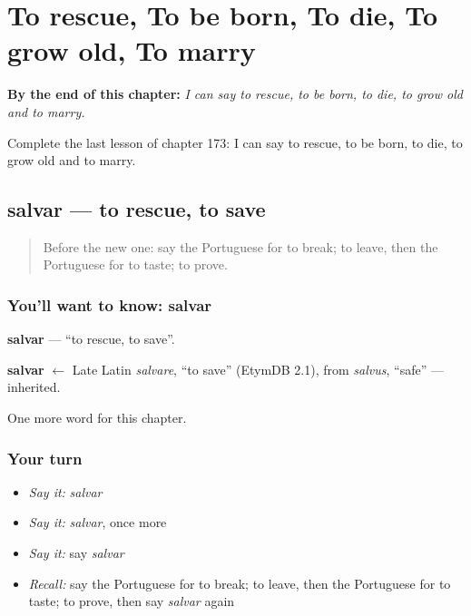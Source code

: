 
\chapter{To rescue, To be born, To die, To grow old, To marry}
\label{ch:pt-to-rescue-to-be-born-to-die-to-grow-old-to-marry}

\begin{chapteropening}
\textbf{By the end of this chapter:} \emph{I can say to rescue, to be born, to die, to grow old and to marry.}

Complete the last lesson of chapter 173: I can say to rescue, to be born, to die, to grow old and to marry.
\end{chapteropening}

\section[salvar]{salvar — to rescue, to save}

\label{lesson:PT-C173-salvar}



\begin{quote}
Before the new one: say the Portuguese for to break; to leave, then the Portuguese for to taste; to prove.
\end{quote}

\subsection*{You'll want to know: salvar}
\textbf{salvar} — \textquotedblleft{}to rescue, to save\textquotedblright{}.

\begin{cousinweb}
\textbf{salvar} $\leftarrow$ Late Latin \emph{salvare}, \textquotedblleft{}to save\textquotedblright{} (EtymDB 2.1), from \emph{salvus}, \textquotedblleft{}safe\textquotedblright{} — inherited.
\end{cousinweb}

\begin{grammarlens}[title={What you've built}]
One more word for this chapter.
\end{grammarlens}

\subsection*{Your turn}
\begin{itemize}
\raggedright
  \item \emph{Say it:} \emph{salvar}
  \item \emph{Say it:} \emph{salvar}, once more
  \item \emph{Say it:} say \emph{salvar}
  \item \emph{Recall:} say the Portuguese for to break; to leave, then the Portuguese for to taste; to prove, then say \emph{salvar} again
\end{itemize}

